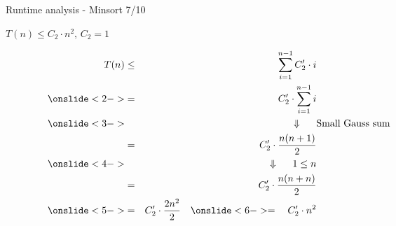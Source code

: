 \documentclass{beamer}
\begin{document}

\begin{frame}{Runtime analysis - Minsort 7/10}
  \begin{tabl}
    $\displaystyle  T(n) \leq C_2 \cdot n^2, \, C_2 = 1$
    \end{tabl}
\color{Mittel-Blau}
    \begin{eqnarray*}
        T(n) & \leq &           \sum \limits^{n - 1}_{i = 1} C'_2\cdot i \\
        \onslide<2->
& = &           C'_2 \cdot \sum \limits^{n - 1}_{i = 1} i\\
        \onslide<3-> & & { \color{black}\hspace*{1cm} \Downarrow \hspace*{0.5cm} \rlap{\text{Small Gauss sum}}}\\
& = &           C'_2 \cdot \frac{n(n + 1)}{2} \\
        \onslide<4-> & & { \color{black}\hspace*{1cm} \Downarrow
          \hspace*{0.5cm} 1 \leq n}\\
& = &           C'_2 \cdot \frac{n(n +n )}{2} \\
        \onslide<5->
& = &           C'_2 \cdot \frac{2n^2}{2}    \quad     \onslide<6->
=\quad C'_2 \cdot n^2
    \end{eqnarray*}

 \end{frame}
\end{document}
